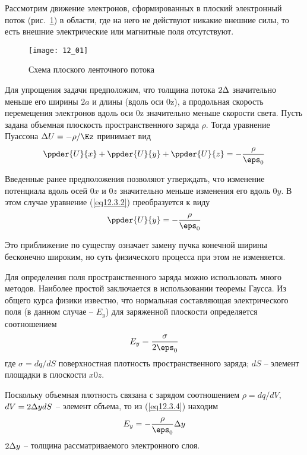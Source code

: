 
Рассмотрим движение электронов, сформированных в плоский электронный поток 
(рис.~\ref{img12.1}) в области, где на него не действуют никакие внешние силы, 
то есть внешние электрические или магнитные поля отсутствуют.

\begin{figure}[h!]
	\center
	\texttt{[image: 12\_01]}
	\caption{Схема плоского ленточного потока}
	\label{img12.1}
\end{figure}

Для упрощения задачи предположим, что толщина потока \( 2\Delta \) значительно 
меньше его ширины \( 2a \) и длины (вдоль оси 0z), а продольная скорость 
перемещения электронов вдоль оси 0z значительно меньше скорости света. Пусть 
задана объемная плоскость пространственного заряда \( \rho \). Тогда уравнение 
Пуассона \( \D U = -\rho / \Ez \) принимает вид
\begin{equation}
	\ppder{U}{x} + \ppder{U}{y} + \ppder{U}{z} = -\frac{\rho}{\eps_0}
	\label{eq12.3.2}
\end{equation}

Введенные ранее предположения позволяют утверждать, что изменение потенциала 
вдоль осей \( 0x \) и \( 0z \) значительно меньше изменения его вдоль 
\( 0y \). В этом случае уравнение (\ref{eq12.3.2}) преобразуется к виду
\begin{equation}
	\ppder{U}{y} = -\frac{\rho}{\eps_0}
	\label{eq12.3.3}
\end{equation}
 
Это приближение по существу означает замену пучка конечной ширины бесконечно 
широким, но суть физического процесса при этом не изменяется.

Для определения поля пространственного заряда можно использовать много 
методов. Наиболее простой заключается в использовании теоремы Гаусса. Из 
общего курса физики известно, что нормальная составляющая электрического поля 
(в данном случае -- \( E_y \)) для заряженной плоскости определяется
соотношением
\begin{equation}
	E_y = \frac{\sigma}{2\eps_0}
	\label{eq12.3.4}
\end{equation}
где \( \sigma = dq/dS \) поверхностная плотность пространственного заряда;
\( dS \) -- элемент площадки в плоскости \( x0z \).

Поскольку объемная плотность связана с зарядом соотношением 
\( \rho = dq/dV \), \( dV = 2\Delta ydS \) -- элемент объема, то из 
(\ref{eq12.3.4}) находим
\begin{equation}
	E_y = -\frac{\rho}{\eps_0}\D y
	\label{eq12.3.5}
\end{equation}
\( 2\Delta y \) -- толщина рассматриваемого электронного слоя.

